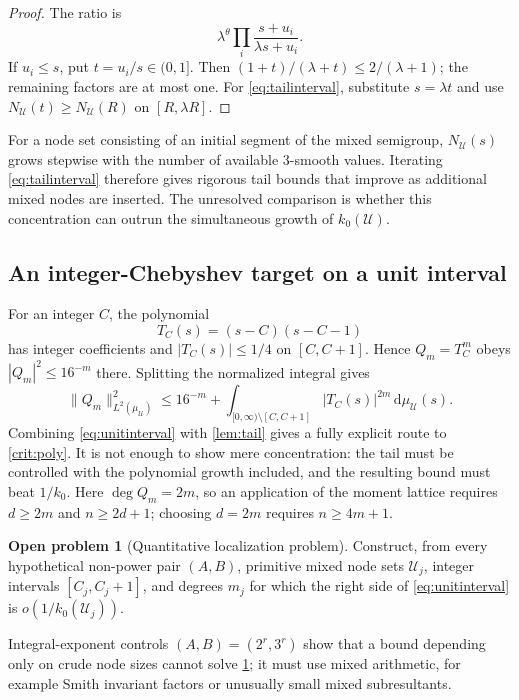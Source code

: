 \documentclass[11pt]{article}
\theoremstyle{definition}
\newtheorem{problem}[theorem]{Open problem}
\theoremstyle{remark}
\newcommand{\dd}{\,\mathrm d}
\newcommand{\UU}{\mathcal U}
\begin{document}
\begin{proof}
The ratio is
\[
 \lambda^\theta\prod_i\frac{s+u_i}{\lambda s+u_i}.
\]
If $u_i\le s$, put $t=u_i/s\in(0,1]$.  Then
$(1+t)/(\lambda+t)\le2/(\lambda+1)$; the remaining factors are at most one.
For \eqref{eq:tailinterval}, substitute $s=\lambda t$ and use
$N_\UU(t)\ge N_\UU(R)$ on $[R,\lambda R]$.
\end{proof}

For a node set consisting of an initial segment of the mixed semigroup, $N_\UU(s)$ grows
stepwise with the number of available $3$-smooth values.  Iterating \eqref{eq:tailinterval}
therefore gives rigorous tail bounds that improve as additional mixed nodes are inserted.
The unresolved comparison is whether this concentration can outrun the simultaneous growth
of $k_0(\UU)$.

\subsection{An integer-Chebyshev target on a unit interval}

For an integer $C$, the polynomial
\[
 T_C(s)=(s-C)(s-C-1)
\]
has integer coefficients and $|T_C(s)|\le1/4$ on $[C,C+1]$.  Hence
$Q_m=T_C^m$ obeys $|Q_m|^2\le16^{-m}$ there.  Splitting the normalized integral gives
\begin{equation}\label{eq:unitinterval}
 \|Q_m\|_{L^2(\mu_\UU)}^2
 \le16^{-m}+
 \int_{[0,\infty)\setminus[C,C+1]}|T_C(s)|^{2m}\dd\mu_\UU(s).
\end{equation}
Combining \eqref{eq:unitinterval} with \cref{lem:tail} gives a fully explicit route to
\cref{crit:poly}.  It is not enough to show mere concentration: the tail must be controlled
with the polynomial growth included, and the resulting bound must beat $1/k_0$.
Here $\deg Q_m=2m$, so an application of the moment lattice requires $d\ge2m$ and
$n\ge2d+1$; choosing $d=2m$ requires $n\ge4m+1$.

\begin{problem}[Quantitative localization problem]\label{prob:localize}
Construct, from every hypothetical non-power pair $(A,B)$, primitive mixed node sets
$\UU_j$, integer intervals $[C_j,C_j+1]$, and degrees $m_j$ for which the right side of
\eqref{eq:unitinterval} is $o(1/k_0(\UU_j))$.
\end{problem}

Integral-exponent controls $(A,B)=(2^r,3^r)$ show that a bound depending only on crude node
sizes cannot solve \cref{prob:localize}; it must use mixed arithmetic, for example Smith
invariant factors or unusually small mixed subresultants.
\end{document}
